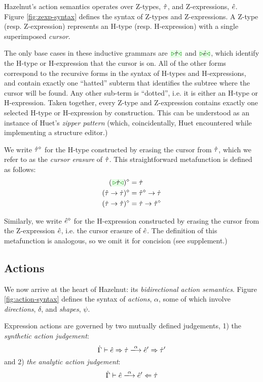 Hazelnut's action semantics operates over Z-types, $\hat{\tau}$, and
Z-expressions, $\hat{e}$. Figure \ref{fig:zexp-syntax} defines the syntax of
Z-types and Z-expressions. A Z-type (resp. Z-expression) represents an
H-type (resp. H-expression) with a single superimposed \emph{cursor}.

The only base cases in these inductive grammars are $\zwsel{\htau}$ and
$\zwsel{\hexp}$, which identify the H-type or H-expression that the cursor
is on. All of the other forms correspond to the recursive forms in the
syntax of H-types and H-expressions, and contain exactly one ``hatted''
subterm that identifies the subtree where the cursor will be found. Any
other sub-term is ``dotted'', i.e. it is either an H-type or
H-expression. Taken together, every Z-type and Z-expression contains
exactly one selected H-type or H-expression by construction. This can be
understood as an instance of Huet's \emph{zipper pattern}
\cite{JFP::Huet1997} (which, coincidentally, Huet encountered while
implementing a structure editor.)

We write $\hat{\tau}^{\diamond}$ for the H-type constructed by erasing the
cursor from $\hat{\tau}$, which we refer to as the \emph{cursor erasure} of
$\hat{\tau}$. This straightforward metafunction is defined as follows:
\begin{align*}
\removeSel{(\zwsel{\htau})} & = \htau\\
\removeSel{(\tarr{\ztau}{\htau})} & = \tarr{\removeSel{\ztau}}{\htau}\\
\removeSel{(\tarr{\htau}{\ztau})} & = \tarr{\htau}{\removeSel{\ztau}}
\end{align*}

Similarly, we write $\hat{e}^{\diamond}$ for the H-expression constructed by
erasing the cursor from the Z-expression $\hat{e}$, i.e. the cursor erasure
of $\hat{e}$. The definition of this metafunction is analogous, so we omit it
for concision (see supplement.)

\subsection{Actions}\label{sec:actions}

We now arrive at the heart of Hazelnut: its \emph{bidirectional action
  semantics}.  Figure \ref{fig:action-syntax} defines the syntax of
\emph{actions}, $\alpha$, some of which involve \emph{directions},
$\delta$, and \emph{shapes}, $\psi$.

Expression actions are governed by two mutually defined judgements, 1) the
\emph{synthetic action judgement}:
\[
\performSyn{\hGamma}{\zexp}{\htau}{\alpha}{\zexp'}{\htau'}
\]
and 2) \emph{the analytic action judgement}:
\[
\performAna{\hGamma}{\zexp}{\htau}{\alpha}{\zexp'}
\]

